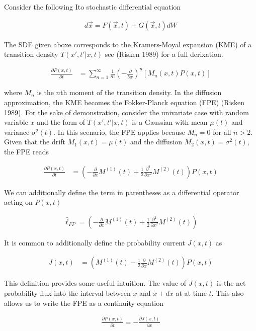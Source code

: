 \documentclass{ucetd}
\begin{document}
\begin{appendices}
Consider the following Ito stochastic differential equation 

\begin{align*}
d\vec{x} = F(\vec{x},t) + G(\vec{x},t)dW
\end{align*}

The SDE gixen aboxe corresponds to the Kramers-Moyal expansion (KME) of a transition density $T(x',t'|x,t)$ see (Risken 1989) for a full derixation.

\begin{align}
\frac{\partial P(x,t)}{\partial t}  &= \sum_{n=1}^{\infty} \frac{1}{n!}\left(-\frac{\partial}{\partial x}\right)^{n} \left[M_{n}(x,t)P(x,t)\right]
\end{align}

where $M_{n}$ is the $n$th moment of the transition density. In the diffusion approximation, the KME becomes the Fokker-Planck equation (FPE) (Risken 1989). For the sake of demonstration, consider the univariate case with random variable $x$ and the form of $T(x',t'|x,t)$ is a Gaussian with mean $\mu(t)$ and variance $\sigma^{2}(t)$. In this scenario, the FPE applies because $M_{n} = 0$ for all $n > 2$. Given that the drift $M_{1}(x,t) = \mu(t)$ and the diffusion $M_{2}(x,t) = \sigma^{2}(t)$, the FPE reads

\begin{align}
\frac{\partial P(x,t)}{\partial t}  &= \left(-\frac{\partial}{\partial x}M^{(1)}(t) + \frac{1}{2}\frac{\partial^{2}}{\partial x^{2}}M^{(2)}(t)\right)P(x,t)
\end{align}

We can additionally define the term in parentheses as a differential operator acting on $P(x,t)$

\begin{align}
\hat{\ell}_{FP} = \left(-\frac{\partial}{\partial x}M^{(1)}(t) + \frac{1}{2}\frac{\partial^{2}}{\partial x^{2}}M^{(2)}(t)\right)
\end{align}

It is common to additionally define the probability current $J(x,t)$ as 

\begin{align}
J(x,t)  &= \left(M^{(1)}(t) - \frac{1}{2}\frac{\partial}{\partial x}M^{(2)}(t)\right)P(x,t)
\end{align}

This definition provides some useful intuition. The value of $J(x,t)$ is the net probability flux into the interval between $x$ and $x+dx$ at at time $t$. This also allows us to write the FPE as a continuity equation

\begin{align}
\frac{\partial P(x,t)}{\partial t} = -\frac{\partial J(x,t)}{\partial x}
\end{align}
\end{appendices}
\end{document}
